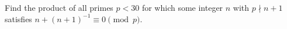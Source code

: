 Find the product of all primes $p<30$ for which some integer $n$ with $p\nmid n+1$ satisfies $n+(n+1)^{-1}\equiv0\pmod p$.
